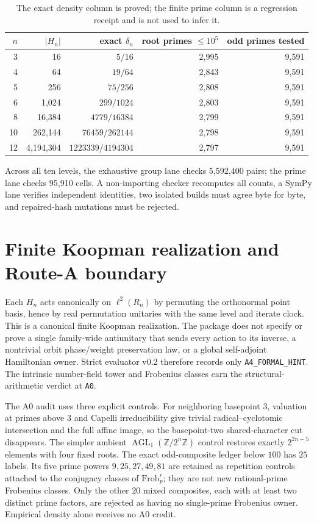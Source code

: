 \documentclass[10pt]{article}
\newcommand{\Z}{\mathbb Z}
\newcommand{\AGL}{\operatorname{AGL}}
\begin{document}
\begin{table}[H]
\centering
\small
\begin{tabular}{@{}rrrrr@{}}
\toprule
$n$ & $|H_n|$ & exact $\delta_n$ & root primes $\le10^5$ & odd primes tested\\
\midrule
3 & 16 & $5/16$ & 2,995 & 9,591\\
4 & 64 & $19/64$ & 2,843 & 9,591\\
5 & 256 & $75/256$ & 2,808 & 9,591\\
6 & 1,024 & $299/1024$ & 2,803 & 9,591\\
8 & 16,384 & $4779/16384$ & 2,799 & 9,591\\
10 & 262,144 & $76459/262144$ & 2,798 & 9,591\\
12 & 4,194,304 & $1223339/4194304$ & 2,797 & 9,591\\
\bottomrule
\end{tabular}
\caption{The exact density column is proved; the finite prime column is a
regression receipt and is not used to infer it.}
\label{tab:evidence}
\end{table}

Across all ten levels, the exhaustive group lane checks 5,592,400 pairs;
the prime lane checks 95,910 cells.  A non-importing checker recomputes all
counts, a SymPy lane verifies independent identities, two isolated builds
must agree byte for byte, and repaired-hash mutations must be rejected.

\section{Finite Koopman realization and Route-A boundary}
Each $H_n$ acts canonically on $\ell^2(R_n)$ by permuting the orthonormal
point basis, hence by real permutation unitaries with the same level and
iterate clock.  This is a canonical finite Koopman realization.  The package
does not specify or prove a single family-wide antiunitary that sends every
action to its inverse, a nontrivial orbit phase/weight preservation law, or a
global self-adjoint Hamiltonian owner.  Strict evaluator v0.2 therefore
records only \texttt{A4\_FORMAL\_HINT}.  The intrinsic number-field tower
and Frobenius classes earn the structural-arithmetic verdict at \texttt{A0}.

The A0 audit uses three explicit controls.  For neighboring basepoint $3$,
valuation at primes above $3$ and Capelli irreducibility give trivial
radical--cyclotomic intersection and the full affine image, so the
basepoint-two shared-character cut disappears.  The simpler ambient
$\AGL_1(\Z/2^n\Z)$ control restores exactly $2^{2n-5}$ elements with four
fixed roots.  The exact odd-composite ledger below $100$ has $25$ labels.
Its five prime powers $9,25,27,49,81$ are retained as repetition controls
attached to the conjugacy classes of $\mathrm{Frob}_p^r$; they are not new
rational-prime Frobenius classes.  Only the other $20$ mixed composites,
each with at least two distinct prime factors, are rejected as having no
single-prime Frobenius owner.
Empirical density alone receives no A0 credit.
\end{document}
